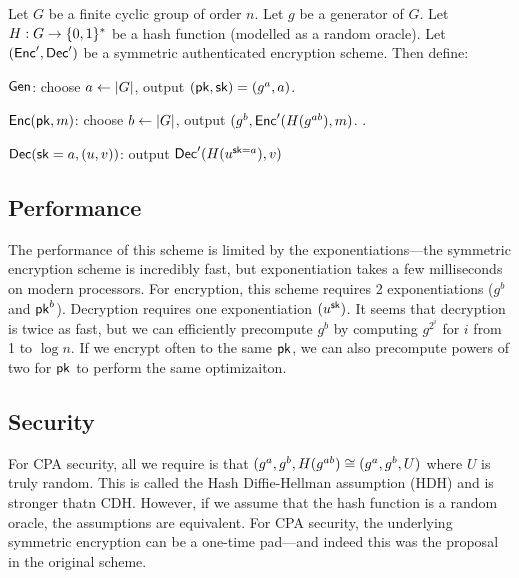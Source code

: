 \begin{definition}[El-Gamal]
	Let $G$ be a finite cyclic group of order $n$. Let $g$ be a generator of $G$. Let $H: G \rightarrow \{0,1\}^*$ be a hash function (modelled as a random oracle). Let $(\mathsf{Enc}', \mathsf{Dec}')$ be a symmetric authenticated encryption scheme. Then define:

	\begin{compactitem}
		\item $\mathsf{Gen}$: choose $a \gets \left| G \right|$, output $(\mathsf{pk}, {\mathsf{sk}}) = (g^a, a)$.	
		\item $\mathsf{Enc}(\mathsf{pk}, m)$: choose $b \gets \left| G \right|$, output $(g^b, \mathsf{Enc}'(H(g^{ab}), m)$. .
		\item $\mathsf{Dec}({\mathsf{sk}}=a, (u, v))$: output $\mathsf{Dec}'(H(u^{{\mathsf{sk}}=a}), v)$ 
	\end{compactitem}
\end{definition}

\subsection{Performance}
The performance of this scheme is limited by the exponentiations---the symmetric encryption scheme is incredibly fast, but exponentiation takes a few milliseconds on modern processors. For encryption, this scheme requires 2 exponentiations ($g^b$ and $\mathsf{pk}^b$). Decryption requires one exponentiation $(u^{\mathsf{sk}})$. It seems that decryption is twice as fast, but we can efficiently precompute $g^b$ by computing $g^{2^i}$ for $i$ from 1 to $\log n$. If we encrypt often to the same $\mathsf{pk}$, we can also precompute powers of two for $\mathsf{pk}$ to perform the same optimizaiton.

\subsection{Security}
For CPA security, all we require is that $(g^a, g^b, H(g^{ab}) \cong (g^a, g^b, U)$ where $U$ is truly random. This is called the Hash Diffie-Hellman assumption (HDH) and is stronger thatn CDH. However, if we assume that the hash function is a random oracle, the assumptions are equivalent. For CPA security, the underlying symmetric encryption can be a one-time pad---and indeed this was the proposal in the original scheme.

